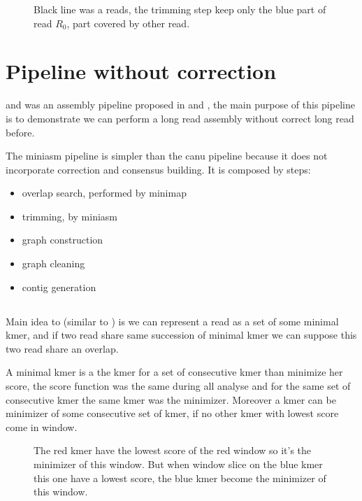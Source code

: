 \documentclass[main]{subfiles}
\begin{document}
\begin{figure}[ht]
    \centering
    
    \caption{Black line was a reads, the \canu trimming step keep only the blue part of read $R_0$, part covered by other read.}
    \label{sota:fig:canu:remapping}
\end{figure}

\section{Pipeline without correction \miniasm} \label{section:sota:miniasm}

\minimap and \miniasm was an assembly pipeline proposed in \cite{miniasm_minimap} and \cite{minimap2}, the main purpose of this pipeline is to demonstrate we can perform a long read assembly without correct long read before.

The miniasm pipeline is simpler than the canu pipeline because it does not incorporate correction and consensus building. It is composed by steps:
\begin{itemize}
    \item overlap search, performed by minimap
    \item trimming, by miniasm
    \item graph construction 
    \item graph cleaning
    \item contig generation
\end{itemize}


\subsection{\minimap} \label{subsec:sota:miniasm:minimap}

Main idea to \minimap (similar to \mhap) is we can represent a read as a set of some minimal kmer, and if two read share same succession of minimal kmer we can suppose this two read share an overlap.

A minimal kmer is a the kmer for a set of consecutive kmer than minimize her score, the score function was the same during all analyse and for the same set of consecutive kmer the same kmer was the minimizer. Moreover a kmer can be minimizer of some consecutive set of kmer, if no other kmer with lowest score come in window. 

\begin{figure}[ht]
    \centering
    
    \caption{The red kmer have the lowest score of the red window so it's the minimizer of this window. But when window slice on the blue kmer this one have a lowest score, the blue kmer become the minimizer of this window.}
    \label{sota:fig:miniasm:minimizer}
\end{figure}
\end{document}
